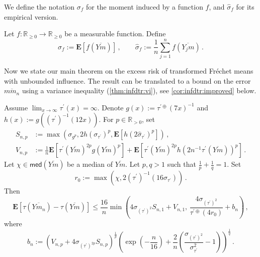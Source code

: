 \documentclass{article}
\newcommand{\R}{\mathbb{R}}
\newcommand{\Rp}{\R_{\geq0}}
\newcommand{\Rpp}{\R_{>0}}
\newcommand{\lab}{\left[} %
\newcommand{\rab}{\right]} %
\newcommand{\ab}[1]{\lab #1 \rab} %
\newcommand{\abOf}[1]{\!\ab{#1}} %
\newcommand{\lb}{\left(} %
\newcommand{\rb}{\right)} %
\newcommand{\br}[1]{\lb #1 \rb} %
\newcommand{\brOf}[1]{\!\br{#1}} %
\newcommand{\E}{\mathbf{E}} %
\newcommand{\EOf}[1]{\E\abOf{#1}}
\newcommand{\pr}{^\prime}
\newcommand{\eqcm}{\,,} %
\newcommand{\eqfs}{\,.}
\newcommand{\ol}[2]{\overline{#1#2}}
\newcommand{\tran}{\tau}
\newcommand{\dtran}{\tau\pr}
\newcommand{\ddrtran}{\tau^{\prime\oplus}}
\newcommand{\invdtran}{(\tau\pr)^{-1}}
\newcommand{\median}{\mathsf{med}}
\begin{document}
We define the notation $\sigma_{f}$ for the moment induced by a function $f$, and $\hat\sigma_{f}$ for its empirical version.
%
\begin{notation}\label{def:infdtr:moments}
    Let $f\colon \Rp \to \Rp$ be a measurable function. 
    Define
    \begin{equation}
        \sigma_{f} := \EOf{f(\ol Ym)} 
        \eqcm\qquad
        \hat\sigma_{f} := \frac1n \sum_{j=1}^n f(\ol {Y_j}m)
        \eqfs
    \end{equation}
\end{notation}
%
Now we state our main theorem on the excess risk of transformed Fr\'echet means with unbounded influence. The result can be translated to a bound on the error $\ol{m}{m_n}$ using a variance inequality (\cref{thm:infdtr:vi}), see \cref{cor:infdtr:improved} below.
%
\begin{theorem}\label{thm:infdtr:improved}
    Assume $\lim_{x\to\infty}\dtran(x) = \infty$.
    Denote $g(x) := \ddrtran(7 x)^{-1}$ and $h(x) := g(\invdtran(12 x))$.
    For $p\in\Rpp$, set
    \begin{align}
        S_{n,p} &:= \max\brOf{
            \sigma_{g^p}, 
            2 h(\sigma_{\dtran})^p,
            \EOf{ h(2\hat\sigma_{\dtran})^p}
        }\eqcm
        \\
        V_{n,p} &:= \frac1n  \EOf{\dtran(\ol{Y}m)^{2p} g(\ol{Y}{m})^p}  + 	\EOf{\dtran(\ol{Y}m)^{2p} h(2n^{-1} \dtran(\ol{Y}m))^p}\eqfs
    \end{align}
    Let $\chi \in  \median(\ol Ym)$ be a median of $\ol Ym$. 
    Let $p,q > 1$ such that $\frac1p + \frac1q = 1$.
    Set 
    \begin{equation}
        r_0 := \max\brOf{\chi, 2 \invdtran\brOf{16 \sigma_{\dtran}}}\eqfs
    \end{equation}
    Then
    \begin{equation}
        \EOf{\tran(\ol Y{m_n}) - \tran(\ol Ym)}
        \leq
        \frac{16}{n} \min\brOf{4 \sigma_{(\dtran)^{2}} S_{n,1} + V_{n,1},\, \frac{4 \sigma_{(\dtran)^2}}{\ddrtran(4r_0)} + b_n} 
        \eqcm
    \end{equation}
    where
    \begin{equation}
        b_n := \br{V_{n,p} + 4 \sigma_{(\dtran)^{2p}} S_{n,p}}^{\frac1p} \br{\exp\brOf{-\frac{n}{16}} +  \frac2n \br{\frac{\sigma_{(\dtran)^2}}{\sigma_{\dtran}^2}-1}}^{\frac1q}
        \eqfs
    \end{equation}
\end{theorem}
%
\end{document}
